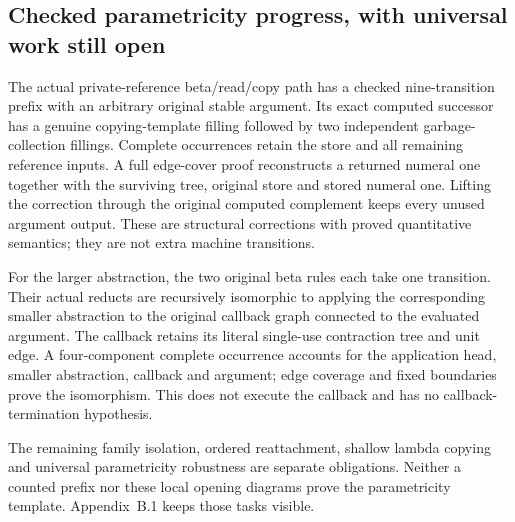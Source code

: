 \par{}
\par{}
\par{}
\par{}
\par{}

\subsection{Checked parametricity progress, with universal work still open}
The actual private-reference beta/read/copy path has a checked nine-transition
prefix with an arbitrary original stable argument. Its exact computed
successor has a genuine copying-template filling followed by two independent
garbage-collection fillings. Complete occurrences retain the store and all
remaining reference inputs. A full edge-cover proof reconstructs a returned
numeral one together with the surviving tree, original store and stored
numeral one. Lifting the correction through the original computed complement
keeps every unused argument output. These are structural corrections with
proved quantitative semantics; they are not extra machine transitions.

For the larger abstraction, the two original beta rules each take one
transition. Their actual reducts are recursively isomorphic to applying the
corresponding smaller abstraction to the original callback graph connected
to the evaluated argument. The callback retains its literal single-use
contraction tree and unit edge. A four-component complete occurrence
accounts for the application head, smaller abstraction, callback and argument;
edge coverage and fixed boundaries prove the isomorphism. This does not
execute the callback and has no callback-termination hypothesis.

The remaining family isolation, ordered reattachment, shallow lambda
copying and universal parametricity robustness are separate obligations.
Neither a counted prefix nor these local opening diagrams prove the
parametricity template. Appendix~B.1 keeps those tasks visible.

\par{}


\par{}


\par{}

